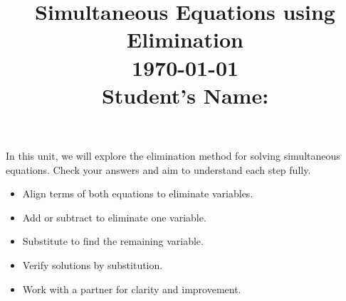 \documentclass[12pt, a4paper, addpoints]{exam}
\title{\large Simultaneous Equations using Elimination \\ \dayofweekname{\day}{\month}{\year} \today \\ \vspace{2mm} \quad Student's Name: \underline{\hspace{8cm}}}
\date{}
\begin{document}
\maketitle

\LARGE
\noindent 
In this unit, we will explore the elimination method for solving simultaneous equations. Check your answers and aim to understand each step fully.

\begin{mdframed}[backgroundcolor=gray!10]
    \begin{multicols}{2}
        \large
        \begin{itemize}
            \item Align terms of both equations to eliminate variables.
            \item Add or subtract to eliminate one variable.
            \item Substitute to find the remaining variable.
            \item Verify solutions by substitution.
            \item Work with a partner for clarity and improvement.
        \end{itemize}
    \end{multicols}
\end{mdframed}

   \LARGE
    \tableofcontents
\newpage

\begin{questions}
 
    \newpage

    \newpage

    \newpage
\end{questions}
\end{document}
